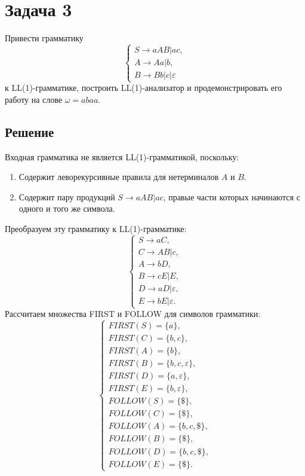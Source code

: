 \documentclass[11pt]{article}
\begin{document}
\section{Задача 3}
\label{sec:orge2821fa}
Привести грамматику
\begin{equation}
\begin{cases}
S \rightarrow aAB | ac, \\
A \rightarrow Aa | b, \\
B \rightarrow Bb | c | \varepsilon
\end{cases}
\end{equation}
к LL(1)-грамматике, построить LL(1)-анализатор и продемонстрировать его работу на слове
\(\omega = abaa\).
\subsection{Решение}
\label{sec:orgfc8ec73}
Входная грамматика не является LL(1)-грамматикой, поскольку:
\begin{enumerate}
\item Содержит леворекурсивные правила для нетерминалов \(A\) и \(B\).
\item Содержит пару продукций \(S \rightarrow aAB | ac\), правые части которых начинаются с одного и того же символа.
\end{enumerate}
Преобразуем эту грамматику к LL(1)-грамматике:
\begin{equation}
\begin{cases}
S \rightarrow aC, \\
C \rightarrow AB | c, \\
A \rightarrow bD, \\
B \rightarrow cE | E, \\
D \rightarrow aD | \varepsilon, \\
E \rightarrow bE | \varepsilon.
\end{cases}
\end{equation}
Рассчитаем множества FIRST и FOLLOW для символов грамматики:
\begin{equation*}
\begin{cases}
FIRST(S) = \{a\}, \\
FIRST(C) = \{b, c\}, \\
FIRST(A) = \{b\}, \\
FIRST(B) = \{b, c, \varepsilon\}, \\
FIRST(D) = \{a, \varepsilon\}, \\
FIRST(E) = \{b, \varepsilon\}, \\
FOLLOW(S) = \{\$\}, \\
FOLLOW(C) = \{\$\}, \\
FOLLOW(A) = \{b, c, \$\}, \\
FOLLOW(B) = \{\$\}, \\
FOLLOW(D) = \{b, c, \$\}, \\
FOLLOW(E) = \{\$\}.
\end{cases}
\end{equation*}
\end{document}
